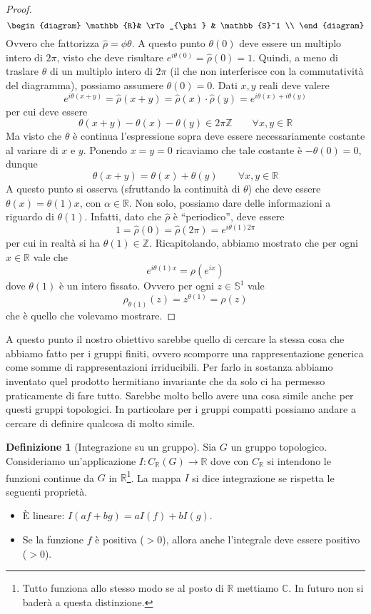 \documentclass[11pt]{article}
\theoremstyle{plain}
\theoremstyle{definition}
\newtheorem{defn}{Definizione}[section]
\theoremstyle{remark}
\newcommand{\C}{\mathbb{C}}
\newcommand{\R}{\mathbb{R}}
\newcommand{\Z}{\mathbb{Z}}
\begin{document}
\begin{proof}
\[\begin{diagram}
    \R          &  \rTo_{\phi}          & \mathbb{S}^1           \\
  \end{diagram}
  \]
Ovvero che fattorizza $\hat\rho=\phi\theta$. A questo punto $\theta(0)$ deve essere un multiplo intero di $2\pi$, visto che deve risultare $e^{i\theta(0)} = \hat\rho(0) = 1$.
Quindi, a meno di traslare $\theta$ di un multiplo intero di $2\pi$ (il che non interferisce con la commutatività del diagramma), possiamo assumere $\theta(0) = 0$. Dati $x,y$ reali deve valere
\[ e^{i\theta(x+y)} = \hat \rho(x+y) = \hat \rho(x )\cdot \hat \rho(y) = e^{i\theta(x)+i \theta(y)}\]
per cui deve essere
\[ \theta(x+y) - \theta(x) - \theta(y) \in 2\pi \Z \qquad \forall x, y \in \R \]
Ma visto che $\theta$ è continua l'espressione sopra deve essere necessariamente costante al variare di $x$ e $y$. Ponendo $x=y=0$ ricaviamo che tale costante è $-\theta(0)=0$, dunque
\[ \theta(x + y) = \theta(x ) + \theta (y) \qquad \forall x,y\in \R\]
A questo punto si osserva (sfruttando la continuità di $\theta$) che deve essere $\theta(x) = \theta(1) x$, con $\alpha \in \R$. Non solo, possiamo dare delle informazioni a riguardo di $\theta(1)$. Infatti, dato che $\hat\rho$ è ``periodico'', deve essere
\[ 1 = \hat\rho(0) = \hat\rho(2\pi) = e^{i\theta(1) 2\pi}\]
per cui in realtà si ha $\theta(1) \in \Z$. 
Ricapitolando, abbiamo mostrato che per ogni $x\in\R$ vale che
\[e^{i \theta(1)x} = \rho(e^{ix}) \]
dove $\theta(1)$ è un intero fissato. Ovvero per ogni $z\in\mathbb{S}^1$ vale
\[ \rho_{\theta(1)}(z) = z^{\theta(1)} = \rho(z) \]
che è quello che volevamo mostrare.

\end{proof}

A questo punto il nostro obiettivo sarebbe quello di cercare la stessa cosa che abbiamo fatto per i gruppi finiti, ovvero scomporre una rappresentazione generica come somme di rappresentazioni irriducibili. Per farlo in sostanza abbiamo inventato quel prodotto hermitiano invariante che da solo ci ha permesso praticamente di fare tutto. Sarebbe molto bello avere una cosa simile anche per questi gruppi topologici. In particolare per i gruppi compatti possiamo andare a cercare di definire qualcosa di molto simile.


\begin{defn}[Integrazione su un gruppo]
Sia $G$ un gruppo topologico. Consideriamo un'applicazione $I: C_{\R}(G) \to \R$
dove con $C_\R$ si intendono le funzioni continue da $G$ in $\R$\footnote{Tutto funziona allo stesso modo se al posto di $\R$ mettiamo $\C$. In futuro non si baderà a questa distinzione.}. La mappa $I$ si dice integrazione se rispetta le seguenti proprietà.
\begin{itemize}
\item \`E lineare: $I(a f + b g) = aI(f) + bI(g)$.
\item Se la funzione $f$ è positiva ($ > 0$), allora anche l'integrale deve essere positivo ($> 0$).
\end{itemize}
\end{defn}
\end{document}
